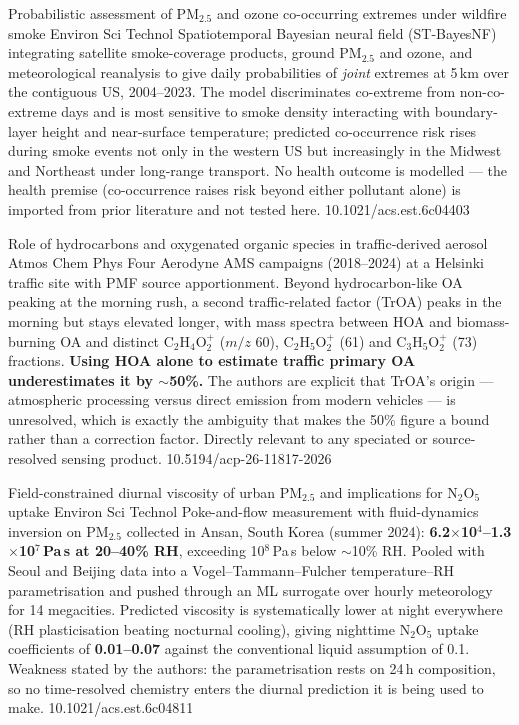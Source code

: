 \documentclass[10pt]{article}
\begin{document}

{Probabilistic assessment of PM$_{2.5}$ and ozone co-occurring extremes under wildfire smoke}
{Environ Sci Technol}
{Spatiotemporal Bayesian neural field (ST-BayesNF) integrating satellite smoke-coverage
products, ground PM$_{2.5}$ and ozone, and meteorological reanalysis to give daily
probabilities of \emph{joint} extremes at 5\,km over the contiguous US, 2004--2023. The
model discriminates co-extreme from non-co-extreme days and is most sensitive to smoke
density interacting with boundary-layer height and near-surface temperature; predicted
co-occurrence risk rises during smoke events not only in the western US but increasingly
in the Midwest and Northeast under long-range transport. No health outcome is modelled ---
the health premise (co-occurrence raises risk beyond either pollutant alone) is imported
from prior literature and not tested here.}
{10.1021/acs.est.6c04403}

{Role of hydrocarbons and oxygenated organic species in traffic-derived aerosol}
{Atmos Chem Phys}
{Four Aerodyne AMS campaigns (2018--2024) at a Helsinki traffic site with PMF source
apportionment. Beyond hydrocarbon-like OA peaking at the morning rush, a second
traffic-related factor (TrOA) peaks in the morning but stays elevated longer, with mass
spectra between HOA and biomass-burning OA and distinct C$_2$H$_4$O$_2^+$ ($m/z$ 60),
C$_2$H$_5$O$_2^+$ (61) and C$_3$H$_5$O$_2^+$ (73) fractions. \textbf{Using HOA alone to
estimate traffic primary OA underestimates it by $\sim$50\%.} The authors are explicit
that TrOA's origin --- atmospheric processing versus direct emission from modern
vehicles --- is unresolved, which is exactly the ambiguity that makes the 50\% figure a
bound rather than a correction factor. Directly relevant to any speciated or
source-resolved sensing product.}
{10.5194/acp-26-11817-2026}

{Field-constrained diurnal viscosity of urban PM$_{2.5}$ and implications for N$_2$O$_5$ uptake}
{Environ Sci Technol}
{Poke-and-flow measurement with fluid-dynamics inversion on PM$_{2.5}$ collected in Ansan,
South Korea (summer 2024): \textbf{6.2$\times$10$^4$--1.3$\times$10$^7$\,Pa\,s at
20--40\% RH}, exceeding 10$^8$\,Pa\,s below $\sim$10\% RH. Pooled with Seoul and Beijing
data into a Vogel--Tammann--Fulcher temperature--RH parametrisation and pushed through an
ML surrogate over hourly meteorology for 14 megacities. Predicted viscosity is
systematically lower at night everywhere (RH plasticisation beating nocturnal cooling),
giving nighttime N$_2$O$_5$ uptake coefficients of \textbf{0.01--0.07} against the
conventional liquid assumption of 0.1. Weakness stated by the authors: the
parametrisation rests on 24\,h composition, so no time-resolved chemistry enters the
diurnal prediction it is being used to make.}
{10.1021/acs.est.6c04811}
\end{document}
